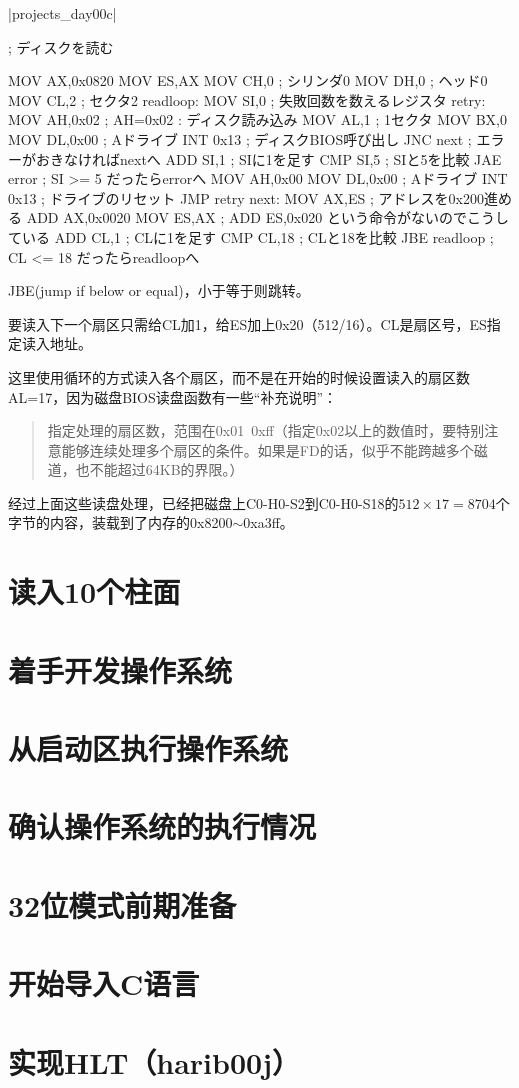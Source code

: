 \dag|projects_day\harib00c|
\begin{code}[label=ipl.nas 本次添加的部分]
; ディスクを読む

		MOV		AX,0x0820
		MOV		ES,AX
		MOV		CH,0			; シリンダ0
		MOV		DH,0			; ヘッド0
		MOV		CL,2			; セクタ2
readloop:
		MOV		SI,0			; 失敗回数を数えるレジスタ
retry:
		MOV		AH,0x02			; AH=0x02 : ディスク読み込み
		MOV		AL,1			; 1セクタ
		MOV		BX,0
		MOV		DL,0x00			; Aドライブ
		INT		0x13			; ディスクBIOS呼び出し
		JNC		next			; エラーがおきなければnextへ
		ADD		SI,1			; SIに1を足す
		CMP		SI,5			; SIと5を比較
		JAE		error			; SI >= 5 だったらerrorへ
		MOV		AH,0x00
		MOV		DL,0x00			; Aドライブ
		INT		0x13			; ドライブのリセット
		JMP		retry
next:
		MOV		AX,ES			; アドレスを0x200進める
		ADD		AX,0x0020
		MOV		ES,AX			; ADD ES,0x020 という命令がないのでこうしている
		ADD		CL,1			; CLに1を足す
		CMP		CL,18			; CLと18を比較
		JBE		readloop		; CL <= 18 だったらreadloopへ
\end{code}

JBE(jump if below or equal)，小于等于则跳转。

要读入下一个扇区只需给CL加1，给ES加上0x20（512/16）。CL是扇区号，ES指定读入地址。

这里使用循环的方式读入各个扇区，而不是在开始的时候设置读入的扇区数AL=17，因为磁盘BIOS读盘函数有一些“补充说明”：
\begin{quote}
  指定处理的扇区数，范围在0x01~0xff（指定0x02以上的数值时，要特别注意能够连续处理多个扇区的条件。如果是FD的话，似乎不能跨越多个磁道，也不能超过64KB的界限。）
\end{quote}

经过上面这些读盘处理，已经把磁盘上C0-H0-S2到C0-H0-S18的$512\times 17=8704$个字节的内容，装载到了内存的0x8200$\sim$0xa3ff。
\section{	读入10个柱面	}
\section{	着手开发操作系统	}
\section{	从启动区执行操作系统	}
\section{	确认操作系统的执行情况	}
\section{	32位模式前期准备	}
\section{	开始导入C语言	}
\section{	实现HLT（harib00j）	}
